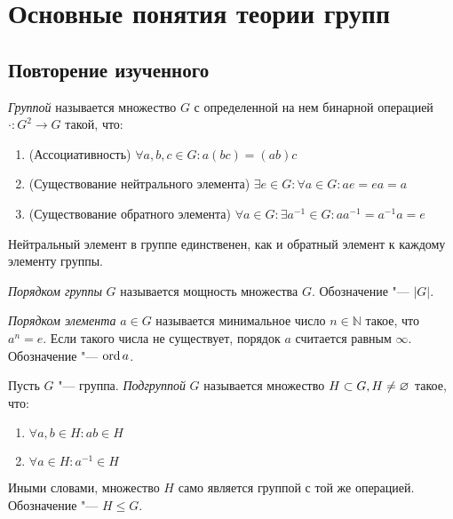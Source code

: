 \section{Основные понятия теории групп}

\subsection{Повторение изученного}

\begin{definition}
	\textit{Группой} называется множество $G$ с определенной на нем бинарной операцией $\cdot: G^2 \to G$ такой, что:
	\begin{enumerate}
		\item (Ассоциативность) $\forall a, b, c \in G: a(bc) = (ab)c$
		
		\item (Существование нейтрального элемента) $\exists e \in G: \forall a \in G: ae = ea = a$
		
		\item (Существование обратного элемента) $\forall a \in G: \exists a^{-1} \in G: aa^{-1} = a^{-1}a = e$
	\end{enumerate}
\end{definition}

\begin{reminder}
	Нейтральный элемент в группе единственен, как и обратный элемент к каждому элементу группы.
\end{reminder}

\begin{definition}
	\textit{Порядком группы} $G$ называется мощность множества $G$. Обозначение "--- $|G|$.
\end{definition}

\begin{definition}
	\textit{Порядком элемента} $a \in G$ называется минимальное число $n \in \mathbb{N}$ такое, что $a^n = e$. Если такого числа не существует, порядок $a$ считается равным $\infty$. Обозначение "--- $\operatorname{ord}{a}$.
\end{definition}

\begin{definition}
	Пусть $G$ "--- группа. \textit{Подгруппой} $G$ называется множество $H \subset G, H \hm\ne \emptyset$ такое, что:
	\begin{enumerate}
		\item $\forall a, b \in H: ab \in H$
		
		\item $\forall a \in H: a^{-1} \in H$
	\end{enumerate}
	
	Иными словами, множество $H$ само является группой с той же операцией. Обозначение "--- $H \le G$.
\end{definition}

